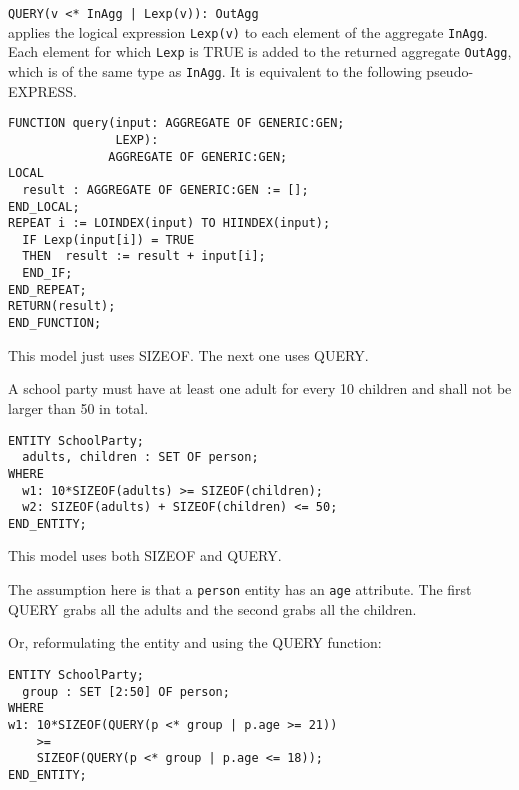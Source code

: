 
\verb?QUERY(v <* InAgg | Lexp(v)): OutAgg? \\
applies the logical expression \texttt{Lexp(v)}
to each element of the aggregate \texttt{InAgg}. Each element for which 
\texttt{Lexp} is TRUE is added to the returned aggregate \texttt{OutAgg}, 
which is of the same type as \texttt{InAgg}.
    It is equivalent to the following pseudo-EXPRESS.
\begin{verbatim}
FUNCTION query(input: AGGREGATE OF GENERIC:GEN; 
               LEXP): 
              AGGREGATE OF GENERIC:GEN;
LOCAL
  result : AGGREGATE OF GENERIC:GEN := [];
END_LOCAL;
REPEAT i := LOINDEX(input) TO HIINDEX(input);
  IF Lexp(input[i]) = TRUE
  THEN  result := result + input[i];
  END_IF;
END_REPEAT;
RETURN(result);
END_FUNCTION;
\end{verbatim}


\begin{remarks}
\remintro
{}

    This model just uses SIZEOF. The next one uses QUERY.

\remend
\end{remarks}


    A school party must have at least one adult for every 10 children 
and shall not be larger than 50 in total.
\begin{verbatim}
ENTITY SchoolParty;
  adults, children : SET OF person;
WHERE
  w1: 10*SIZEOF(adults) >= SIZEOF(children);
  w2: SIZEOF(adults) + SIZEOF(children) <= 50;
END_ENTITY;
\end{verbatim}


\begin{remarks}
\remintro
{}

    This model uses both SIZEOF and QUERY.

    The assumption here is that a \texttt{person} entity has
an \texttt{age} attribute. The first QUERY grabs all the adults 
and the second grabs all the children.

\remend
\end{remarks}

\clearpage

Or, reformulating the entity and using the QUERY function:

\begin{verbatim}
ENTITY SchoolParty;
  group : SET [2:50] OF person;
WHERE
w1: 10*SIZEOF(QUERY(p <* group | p.age >= 21))
    >=
    SIZEOF(QUERY(p <* group | p.age <= 18));
END_ENTITY;
\end{verbatim}


